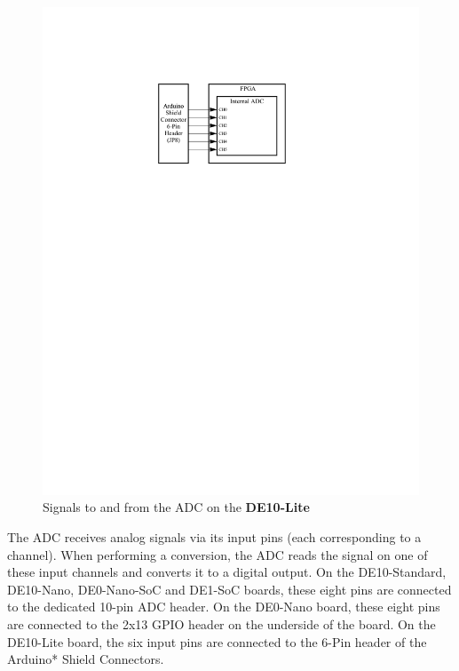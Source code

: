 \documentclass[11pt, twoside, pdftex]{article}
\begin{document}
\begin{figure} [H]
\begin{center}
\includegraphics[scale = 1]{figures/signal_diagram_max10.pdf}
\end{center}
\caption{Signals to and from the ADC on the {\bf DE10-Lite} }
\label{fig:signal3}
\end{figure}

The ADC receives analog signals via its input pins (each corresponding to a channel). When performing a conversion, the ADC reads the signal on one of
these input channels and converts it to a digital output. On the DE10-Standard, DE10-Nano, DE0-Nano-SoC and DE1-SoC boards, these eight pins are connected to the dedicated 10-pin ADC header. 
On the DE0-Nano board, these eight pins are connected to the 2x13 GPIO header on the underside of the
board. On the DE10-Lite board, the six input pins are connected to the 6-Pin header of the Arduino* Shield Connectors. 
\end{document}
